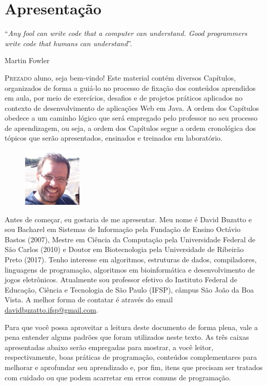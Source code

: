 \chapter*{Apresentação}
\epigraph{``\textit{Any fool can write code that a computer can understand. Good programmers write code that humans can understand}''.}{Martin Fowler}

\lettrine[lines=4, lhang=0.1, lraise=0, loversize=0.2, findent=0.1em]{\textcolor{corAzulTema}{P}}{rezado} aluno, seja bem-vindo! Este material contém diversos Capítulos, organizados de forma a guiá-lo no processo de fixação dos conteúdos aprendidos em aula, por meio de exercícios, desafios e de projetos práticos aplicados no contexto de desenvolvimento de aplicações Web em Java. A ordem dos Capítulos obedece a um caminho lógico que será empregado pelo professor no seu processo de aprendizagem, ou seja, a ordem dos Capítulos segue a ordem cronológica dos tópicos que serão apresentados, ensinados e treinados em laboratório.

\begin{figure}
    \centering
    \includegraphics[width=0.25\textwidth]{imagens/david}
\end{figure}

Antes de começar, eu gostaria de me apresentar. Meu nome é David Buzatto e sou Bacharel em Sistemas de Informação pela Fundação de Ensino Octávio Bastos (2007), Mestre em Ciência da Computação pela Universidade Federal de São Carlos (2010) e Doutor em Biotecnologia pela Universidade de Ribeirão Preto (2017). Tenho interesse em algoritmos, estruturas de dados, compiladores, linguagens de programação, algoritmos em bioinformática e desenvolvimento de jogos eletrônicos. Atualmente sou professor efetivo do Instituto Federal de Educação, Ciência e Tecnologia de São Paulo (IFSP), câmpus São João da Boa Vista. A melhor forma de contatar é através do email \textcolor{blue}{\href{mailto:davidbuzatto.ifsp@gmail.com}{davidbuzatto.ifsp@gmail.com}}.

Para que você possa aproveitar a leitura deste documento de forma plena, vale a pena entender alguns padrões que foram utilizados neste texto. As três caixas apresentadas abaixo serão empregadas para mostrar, a você leitor, respectivamente, boas práticas de programação, conteúdos complementares para melhorar e aprofundar seu aprendizado e, por fim, itens que precisam ser tratados com cuidado ou que podem acarretar em erros comuns de programação.

